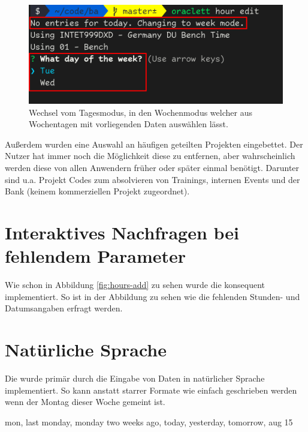 \documentclass[oneside,bibliography=totocnumbered,BCOR=5mm]{scrbook}
\newenvironment{code}{\captionsetup{type=listing, skip=0pt}}{}
\begin{document}
\begin{figure}
  \centering
  \includegraphics[scale=0.5]{day-week-mode.png}
  \caption{Wechsel vom Tagesmodus, in den Wochenmodus welcher aus Wochentagen mit vorliegenden Daten auswählen lässt.}
  \label{fig:day-week-mode}
\end{figure}

Außerdem wurden eine Auswahl an häufigen geteilten Projekten eingebettet. Der
Nutzer hat immer noch die Möglichkeit diese zu entfernen, aber wahrscheinlich
werden diese von allen Anwendern früher oder später einmal benötigt. Darunter
sind u.a. Projekt Codes zum absolvieren von Trainings, internen Events und der
Bank (keinem kommerziellen Projekt zugeordnet).

\section{Interaktives Nachfragen bei fehlendem Parameter}

Wie schon in Abbildung \ref{fig:hours-add} zu sehen wurde die
 konsequent implementiert. So ist in der
Abbildung zu sehen wie die fehlenden Stunden- und Datumsangaben erfragt werden.

\medskip


\section{Natürliche Sprache}
\label{sec:sol-natural-lang}

Die  wurde primär durch die Eingabe von Daten in
natürlicher Sprache implementiert. So kann anstatt starrer Formate wie
 einfach  geschrieben werden wenn
der Montag dieser Woche gemeint ist.

\begin{code}
  \medskip
  \begin{shellcode}
  mon, last monday, monday two weeks ago, today, yesterday, tomorrow, aug 15
  \end{shellcode}
\end{code}
\end{document}
